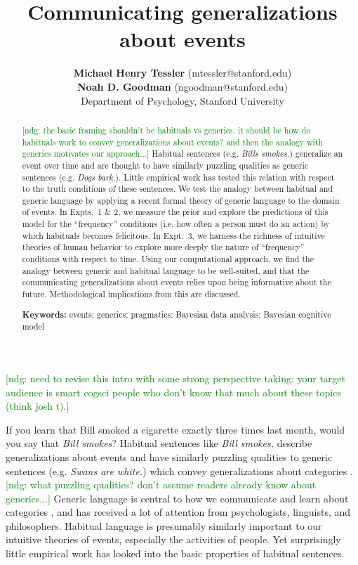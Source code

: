 \documentclass[10pt,letterpaper]{article}
\title{Communicating generalizations about events}
\author{{\large \bf Michael Henry Tessler} (mtessler@stanford.edu) \\
 {\large \bf Noah D. Goodman} (ngoodman@stanford.edu) \\
  Department of Psychology, Stanford University}
\newcommand{\ndg}[1]{\textcolor{Green}{[ndg: #1]}}
\begin{document}
\maketitle


\begin{abstract}
\ndg{the basic framing shouldn't be habituals vs generics. it should be how do habituals work to convey generalizations about events? and then the analogy with generics motivates our approach...}
Habitual sentences (e.g. \emph{Bills smokes.}) generalize an event over time and are thought to have similarly puzzling qualities as generic sentences (e.g. \emph{Dogs bark.}). 
Little empirical work has tested this relation with respect to the truth conditions of these sentences. 
We test the analogy between habitual and generic language by applying a recent formal theory of generic language to the domain of events.
In Expts.~1 \& 2, we measure the prior and explore the predictions of this model for the
``frequency'' conditions (i.e. how often a person must do an action) 
by which habituals becomes felicitous.
In Expt.~3, we harness the richness of intuitive theories of human behavior to explore more deeply the nature of ``frequency'' conditions with respect to time.
Using our computational approach, we find the analogy between generic and habitual language to be well-suited, and that the communicating generalizations about events relies upon being informative about the future.
Methodological implications from this are discussed.


\textbf{Keywords:} 
events; generics; pragmatics; Bayesian data analysis; Bayesian cognitive model
\end{abstract}

\ndg{need to revise this intro with some strong perspective taking: your target audience is smart cogsci people who don't know that much about these topics (think josh t).}

If you learn that Bill smoked a cigarette exactly three times last month, would you say that \emph{Bill smokes}?
Habitual sentences like \emph{Bill smokes.} describe generalizations about events and have similarly puzzling qualities to generic sentences (e.g. \emph{Swans are white.}) which convey generalizations about categories \cite{Carlson2005}. \ndg{what puzzling qualities? don't assume readers already know about generics...}
Generic language is central to how we communicate and learn about categories \cite{Carlson1977, Gelman2004}, and has received a lot of attention from psychologists, linguists, and philosophers.
Habitual language is presumably similarly important to our intuitive theories of events, especially the activities of people.
Yet surprisingly little empirical work has looked into the basic properties of habitual sentences.
\end{document}
